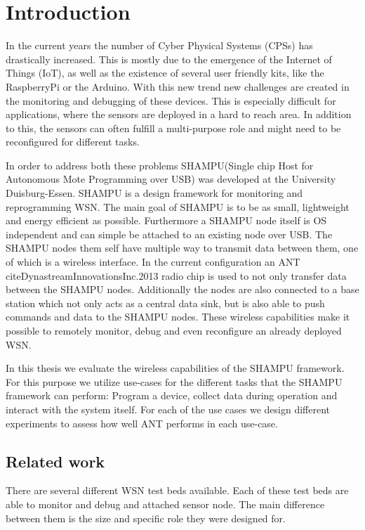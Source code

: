 \chapter{Introduction}
\label{sec:intro}
In the current years the number of Cyber Physical Systems (CPSs) has drastically increased. This is mostly due to the emergence of the Internet of Things (IoT), as well as the existence of several user friendly kits, like the RaspberryPi or the Arduino. With this new trend new challenges are created in the monitoring and debugging of these devices. This is especially difficult for applications, where the sensors are deployed in a hard to reach area. In addition to this, the sensors can often fulfill a multi-purpose role and might need to be reconfigured for different tasks.

In order to address both these problems SHAMPU(Single chip Host for Autonomous Mote Programming over USB)\cite{smeets2014demonstration} was developed at the University Duisburg-Essen. SHAMPU is a design framework for monitoring and reprogramming WSN. The main goal of SHAMPU is to be as small, lightweight and energy efficient as possible. Furthermore a SHAMPU node itself is OS independent and can simple be attached to an existing node over USB. The SHAMPU nodes them self have multiple way to transmit data between them, one of which is a wireless interface. In the current configuration an ANT cite{DynastreamInnovationsInc.2013} radio chip is used to not only transfer data between the SHAMPU nodes. Additionally the nodes are also connected to a base station which not only acts as a central data sink, but is also able to push commands and data to the SHAMPU nodes. These wireless capabilities make it possible to remotely monitor, debug and even reconfigure an already deployed WSN. 

In this thesis we evaluate the wireless capabilities of the SHAMPU framework. For this purpose we utilize use-cases for the different tasks that the SHAMPU framework can perform: Program a device, collect data during operation and interact with the system itself. For each of the use cases we design different experiments to assess how well ANT performs in each use-case.
\newpage
\section{Related work}
\label{sec:related_work}
There are several different WSN test beds available. Each of these test beds are able to monitor and debug and attached sensor node. The main difference between them is the size and specific role they were designed for. 

